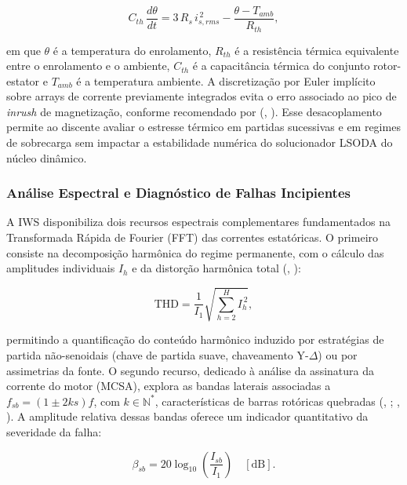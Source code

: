 \begin{equation}
\label{eq:thermal}
C_{th}\,\frac{d\theta}{dt} = 3\,R_s\,i_{s,rms}^{\,2} - \frac{\theta - T_{amb}}{R_{th}},
\end{equation}

\noindent em que $\theta$ é a temperatura do enrolamento, $R_{th}$ é a resistência térmica equivalente entre o enrolamento e o ambiente, $C_{th}$ é a capacitância térmica do conjunto rotor-estator e $T_{amb}$ é a temperatura ambiente. A discretização por Euler implícito sobre arrays de corrente previamente integrados evita o erro associado ao pico de \textit{inrush} de magnetização, conforme recomendado por (\citeauthor{karakas2009aggregation}, \citeyear{karakas2009aggregation}). Esse desacoplamento permite ao discente avaliar o estresse térmico em partidas sucessivas e em regimes de sobrecarga sem impactar a estabilidade numérica do solucionador LSODA do núcleo dinâmico.

\subsubsection{Análise Espectral e Diagnóstico de Falhas Incipientes}

A IWS disponibiliza dois recursos espectrais complementares fundamentados na Transformada Rápida de Fourier (FFT) das correntes estatóricas. O primeiro consiste na decomposição harmônica do regime permanente, com o cálculo das amplitudes individuais $I_h$ e da distorção harmônica total (\citeauthor{mohapatra2019steady}, \citeyear{mohapatra2019steady}):

\begin{equation}
\label{eq:thd}
\text{THD} = \frac{1}{I_1}\sqrt{\sum_{h=2}^{H} I_h^{\,2}},
\end{equation}

\noindent permitindo a quantificação do conteúdo harmônico induzido por estratégias de partida não-senoidais (chave de partida suave, chaveamento Y-$\Delta$) ou por assimetrias da fonte. O segundo recurso, dedicado à análise da assinatura da corrente do motor (MCSA), explora as bandas laterais associadas a $f_{sb} = (1 \pm 2ks)f$, com $k \in \mathbb{N}^{*}$, características de barras rotóricas quebradas (\citeauthor{arkan2005modelling}, \citeyear{arkan2005modelling}; \citeauthor{tuanmohamad2024advance}, \citeyear{tuanmohamad2024advance}). A amplitude relativa dessas bandas oferece um indicador quantitativo da severidade da falha:

\begin{equation}
\label{eq:mcsa_severity}
\beta_{sb} = 20\log_{10}\!\left(\frac{I_{sb}}{I_1}\right) \quad [\mathrm{dB}].
\end{equation}

